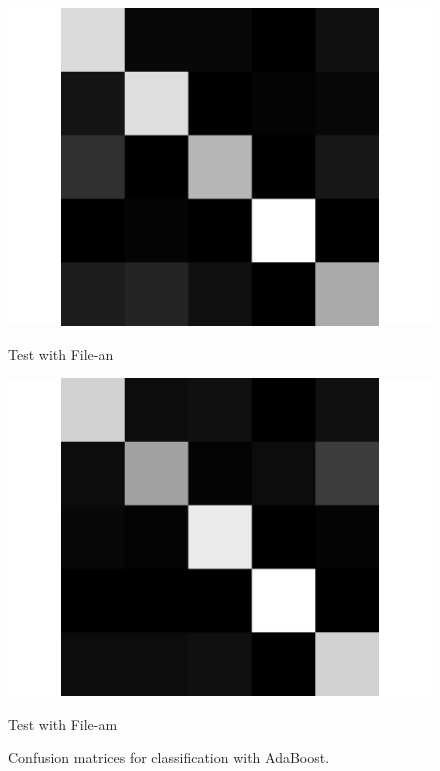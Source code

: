 \documentclass[letterpaper]{article}
\begin{document}
\begin{figure}
\begin{minipage}{.45\linewidth}
   \includegraphics[width=\linewidth]{confusionmatrices/boost_train_am_test_an.png}
   \small\centerline{Test with File-an}\normalsize
   \end{minipage}
\begin{minipage}{.45\linewidth}
   \includegraphics[width=\linewidth]{confusionmatrices/boost_train_an_test_am.png}
   \small\centerline{Test with File-am}\normalsize
   \end{minipage}
   \caption{Confusion matrices for classification with AdaBoost.}
\end{figure}
\end{document}
